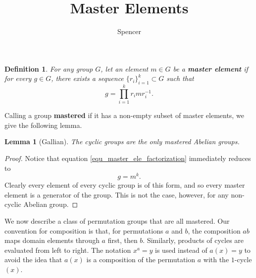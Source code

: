\documentclass[12pt]{article}
\title{Master Elements}
\author{Spencer}
\newtheorem{definition}{Definition}[section]
\newtheorem{lemma}{Lemma}[section]
\begin{document}
\maketitle

\begin{definition}
For any group $G$, let an element $m\in G$ be a \textbf{master element} if for
every $g\in G$, there exists a sequence $\{r_i\}_{i=1}^k\subset G$ such that
\begin{equation}\label{equ_master_ele}
g = \prod_{i=1}^k r_imr_i^{-1}.
\end{equation}
\end{definition}

Calling a group \textbf{mastered} if it has a non-empty subset of master elements,
we give the following lemma.

\begin{lemma}[Gallian]
The cyclic groups are the only mastered Abelian groups.
\end{lemma}
\begin{proof}
Notice that equation \eqref{equ_master_ele_factorization} immediately reduces to
\begin{equation*}
g = m^k.
\end{equation*}
Clearly every element of every cyclic group is of this
form, and so every master element is a generator of the group.
This is not the case, however, for any non-cyclic Abelian group.
\end{proof}

We now describe a class of permutation groups that are all mastered.
Our convention for composition is that, for permutations $a$ and $b$, the
composition $ab$ maps domain elements through $a$ first, then $b$.
Similarly, products of cycles are evaluated from left to right.
The notation $x^a=y$ is used instead of $a(x)=y$ to avoid
the idea that $a(x)$ is a composition of the permutation $a$
with the $1$-cycle $(x)$.
\end{document}
